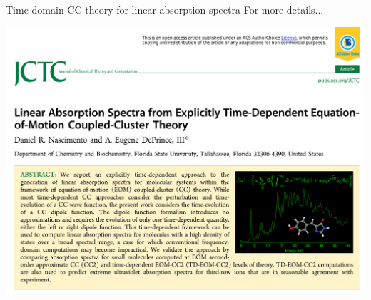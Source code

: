 \documentclass{beamer}
\begin{document}
\begin{frame}{Time-domain CC theory for linear absorption spectra}
 For more details...\\
 \vspace{10pt}
 \begin{center}
 \includegraphics[scale=0.5]{figures/jctc.png} 
 \end{center}
\end{frame}
\end{document}
